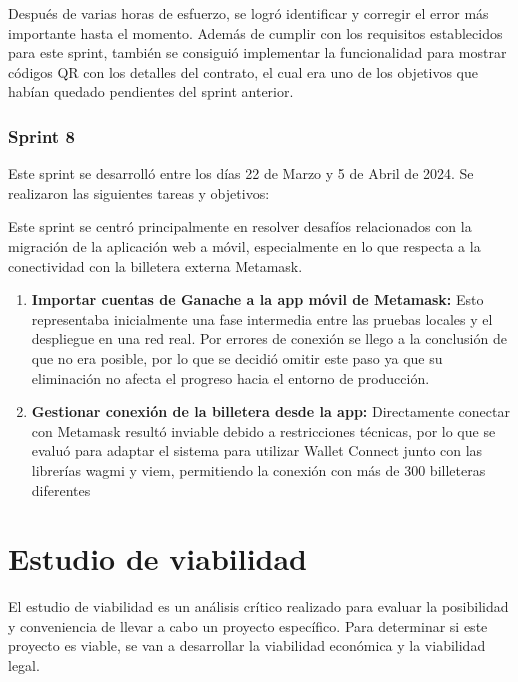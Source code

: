 Después de varias horas de esfuerzo, se logró identificar y corregir el error más importante hasta el momento. Además de cumplir con los requisitos establecidos para este sprint, también se consiguió implementar la funcionalidad para mostrar códigos QR con los detalles del contrato, el cual era uno de los objetivos que habían quedado pendientes del sprint anterior. 

\subsubsection{Sprint 8}

Este sprint se desarrolló entre los días 22 de Marzo y 5 de Abril de 2024. Se realizaron las siguientes tareas y objetivos:

Este sprint se centró principalmente en resolver desafíos relacionados con la migración de la aplicación web a móvil, especialmente en lo que respecta a la conectividad con la billetera externa Metamask.

\begin{enumerate}

\item \textbf{Importar cuentas de Ganache a la app móvil de Metamask:} Esto representaba inicialmente una fase intermedia entre las pruebas locales y el despliegue en una red real.
Por errores de conexión se llego a la conclusión de que no era posible, por lo que se decidió omitir este paso ya que su eliminación no afecta el progreso hacia el entorno de producción.

\item \textbf{Gestionar conexión de la billetera desde la app:} Directamente conectar con Metamask resultó inviable debido a restricciones técnicas, por lo que se evaluó para adaptar el sistema para utilizar Wallet Connect junto con las librerías wagmi y viem, permitiendo la conexión con más de 300 billeteras diferentes

\end{enumerate}



\section{Estudio de viabilidad}

El estudio de viabilidad es un análisis crítico realizado para evaluar la posibilidad y conveniencia de llevar a cabo un proyecto específico.
Para determinar si este proyecto es viable, se van a desarrollar la viabilidad económica y la viabilidad legal.


